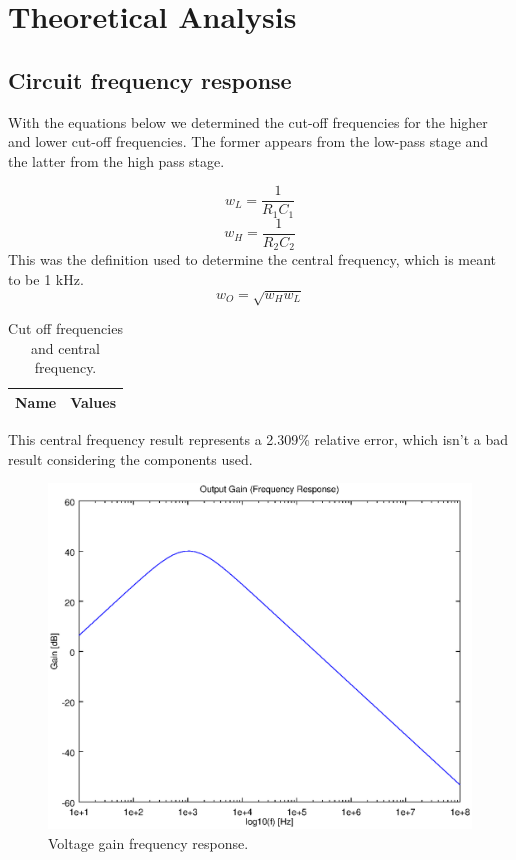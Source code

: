 
\section{Theoretical Analysis}
\label{sec:analysis}
\subsection{Circuit frequency response}
With the equations below we determined the cut-off frequencies for the higher and lower cut-off frequencies. The former appears from the low-pass stage and the latter from the high pass stage.

\begin{equation}
w_L=\frac{1}{R_{1}C_{1}}
\end{equation}
\begin{equation}
w_H=\frac{1}{R_{2}C_{2}}
\end{equation}
This was the definition used to determine the central frequency, which is meant to be 1 kHz.
\begin{equation}
w_O=\sqrt{w_{H}w_{L}}
\end{equation}

\begin{table}[h!]
  \centering
  \begin{tabular}{|l|r|}
    \hline    
    {\bf Name} & {\bf Values} \\ \hline
     
  \end{tabular}
  \caption{Cut off frequencies and central frequency.}
  \label{tab:data}
\end{table}

This central frequency result represents a 2.309\% relative error, which isn't a bad result considering the components used.

\begin{figure}[h!] \centering
\includegraphics[width=0.6\linewidth]{gain.eps}
\caption{Voltage gain frequency response.}
\label{fig:gainfreq}
\end{figure}

